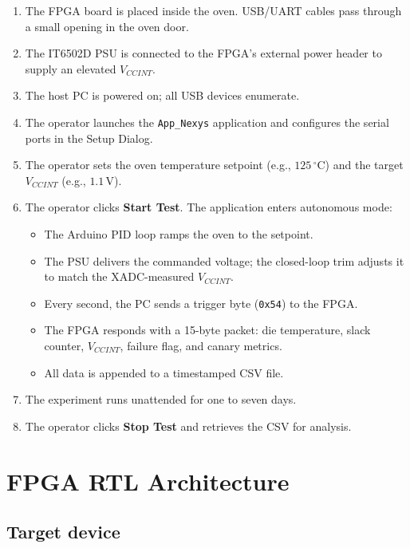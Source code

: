 \documentclass[12pt, a4paper]{report}
\begin{document}
\begin{enumerate}
  \item The FPGA board is placed inside the oven. USB/UART cables pass through
        a small opening in the oven door.
  \item The IT6502D PSU is connected to the FPGA's external power header to supply
        an elevated $V_{CCINT}$.
  \item The host PC is powered on; all USB devices enumerate.
  \item The operator launches the \texttt{App\_Nexys} application and configures the
        serial ports in the Setup Dialog.
  \item The operator sets the oven temperature setpoint (e.g., $125\,^\circ\text{C}$)
        and the target $V_{CCINT}$ (e.g., $1.1\,\text{V}$).
  \item The operator clicks \textbf{Start Test}. The application enters autonomous mode:
        \begin{itemize}
          \item The Arduino PID loop ramps the oven to the setpoint.
          \item The PSU delivers the commanded voltage; the closed-loop trim adjusts it
                to match the XADC-measured $V_{CCINT}$.
          \item Every second, the PC sends a trigger byte (\texttt{0x54}) to the FPGA.
          \item The FPGA responds with a 15-byte packet: die temperature, slack counter,
                $V_{CCINT}$, failure flag, and canary metrics.
          \item All data is appended to a timestamped CSV file.
        \end{itemize}
  \item The experiment runs unattended for one to seven days.
  \item The operator clicks \textbf{Stop Test} and retrieves the CSV for analysis.
\end{enumerate}

\chapter{FPGA RTL Architecture}
\label{ch:rtl}

\section{Target device}
\end{document}
